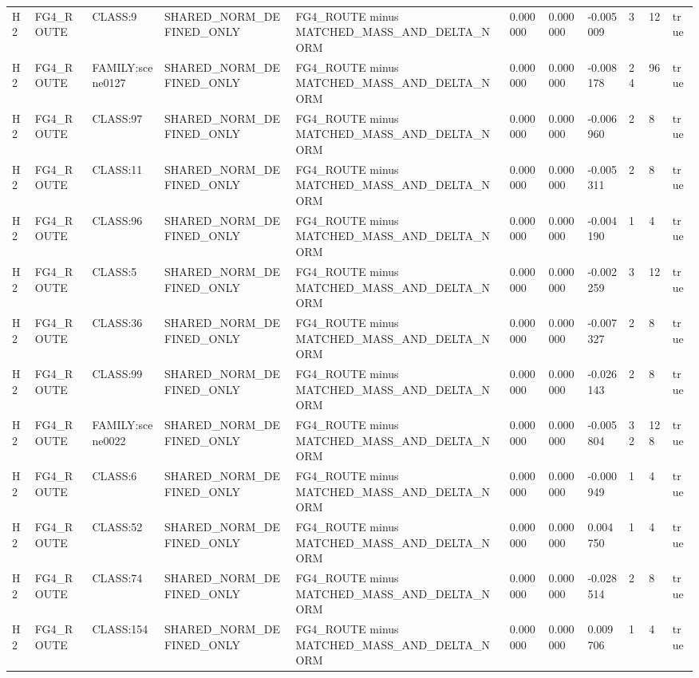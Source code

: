\begin{tabular}{lllllllllll}
H2 & FG4\_ROUTE & CLASS:9 & SHARED\_NORM\_DEFINED\_ONLY & FG4\_ROUTE minus MATCHED\_MASS\_AND\_DELTA\_NORM & 0.000000 & 0.000000 & -0.005009 & 3 & 12 & true \\
H2 & FG4\_ROUTE & FAMILY:scene0127 & SHARED\_NORM\_DEFINED\_ONLY & FG4\_ROUTE minus MATCHED\_MASS\_AND\_DELTA\_NORM & 0.000000 & 0.000000 & -0.008178 & 24 & 96 & true \\
H2 & FG4\_ROUTE & CLASS:97 & SHARED\_NORM\_DEFINED\_ONLY & FG4\_ROUTE minus MATCHED\_MASS\_AND\_DELTA\_NORM & 0.000000 & 0.000000 & -0.006960 & 2 & 8 & true \\
H2 & FG4\_ROUTE & CLASS:11 & SHARED\_NORM\_DEFINED\_ONLY & FG4\_ROUTE minus MATCHED\_MASS\_AND\_DELTA\_NORM & 0.000000 & 0.000000 & -0.005311 & 2 & 8 & true \\
H2 & FG4\_ROUTE & CLASS:96 & SHARED\_NORM\_DEFINED\_ONLY & FG4\_ROUTE minus MATCHED\_MASS\_AND\_DELTA\_NORM & 0.000000 & 0.000000 & -0.004190 & 1 & 4 & true \\
H2 & FG4\_ROUTE & CLASS:5 & SHARED\_NORM\_DEFINED\_ONLY & FG4\_ROUTE minus MATCHED\_MASS\_AND\_DELTA\_NORM & 0.000000 & 0.000000 & -0.002259 & 3 & 12 & true \\
H2 & FG4\_ROUTE & CLASS:36 & SHARED\_NORM\_DEFINED\_ONLY & FG4\_ROUTE minus MATCHED\_MASS\_AND\_DELTA\_NORM & 0.000000 & 0.000000 & -0.007327 & 2 & 8 & true \\
H2 & FG4\_ROUTE & CLASS:99 & SHARED\_NORM\_DEFINED\_ONLY & FG4\_ROUTE minus MATCHED\_MASS\_AND\_DELTA\_NORM & 0.000000 & 0.000000 & -0.026143 & 2 & 8 & true \\
H2 & FG4\_ROUTE & FAMILY:scene0022 & SHARED\_NORM\_DEFINED\_ONLY & FG4\_ROUTE minus MATCHED\_MASS\_AND\_DELTA\_NORM & 0.000000 & 0.000000 & -0.005804 & 32 & 128 & true \\
H2 & FG4\_ROUTE & CLASS:6 & SHARED\_NORM\_DEFINED\_ONLY & FG4\_ROUTE minus MATCHED\_MASS\_AND\_DELTA\_NORM & 0.000000 & 0.000000 & -0.000949 & 1 & 4 & true \\
H2 & FG4\_ROUTE & CLASS:52 & SHARED\_NORM\_DEFINED\_ONLY & FG4\_ROUTE minus MATCHED\_MASS\_AND\_DELTA\_NORM & 0.000000 & 0.000000 & 0.004750 & 1 & 4 & true \\
H2 & FG4\_ROUTE & CLASS:74 & SHARED\_NORM\_DEFINED\_ONLY & FG4\_ROUTE minus MATCHED\_MASS\_AND\_DELTA\_NORM & 0.000000 & 0.000000 & -0.028514 & 2 & 8 & true \\
H2 & FG4\_ROUTE & CLASS:154 & SHARED\_NORM\_DEFINED\_ONLY & FG4\_ROUTE minus MATCHED\_MASS\_AND\_DELTA\_NORM & 0.000000 & 0.000000 & 0.009706 & 1 & 4 & true \\

\end{tabular}

